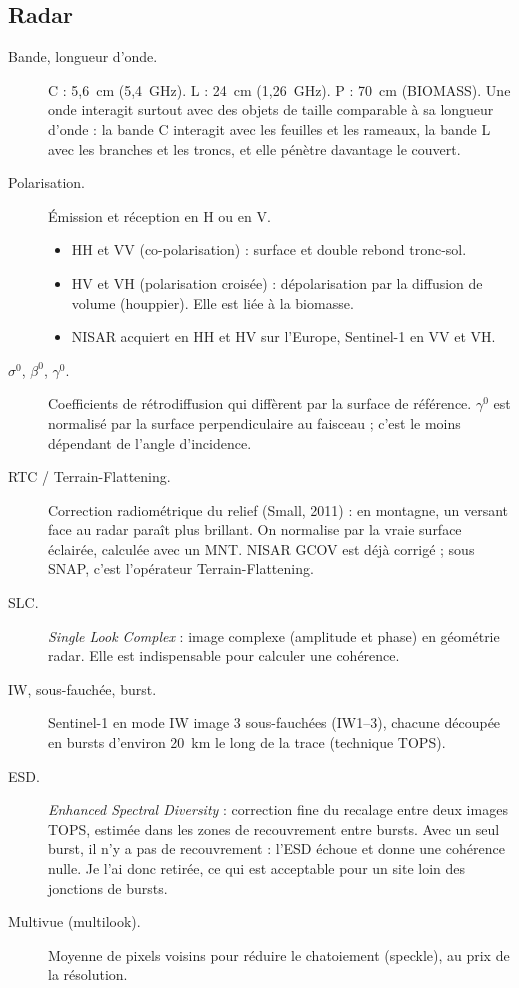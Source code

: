 \documentclass[11pt,a4paper]{article}
\begin{document}
\subsection{Radar}
\begin{description}
\item[Bande, longueur d'onde.] C : 5,6~cm (5,4~GHz). L : 24~cm (1,26~GHz). P : 70~cm (BIOMASS). Une onde interagit
  surtout avec des objets de taille comparable à sa longueur d'onde : la bande C interagit avec les feuilles et les
  rameaux, la bande L avec les branches et les troncs, et elle pénètre davantage le couvert.
\item[Polarisation.] Émission et réception en H ou en V.
  \begin{itemize}
  \item HH et VV (co-polarisation) : surface et double rebond tronc-sol.
  \item HV et VH (polarisation croisée) : dépolarisation par la diffusion de volume (houppier). Elle est liée à la
    biomasse.
  \item NISAR acquiert en HH et HV sur l'Europe, Sentinel-1 en VV et VH.
  \end{itemize}
\item[$\sigma^0$, $\beta^0$, $\gamma^0$.] Coefficients de rétrodiffusion qui diffèrent par la surface de référence.
  $\gamma^0$ est normalisé par la surface perpendiculaire au faisceau ; c'est le moins dépendant de l'angle
  d'incidence.
\item[RTC / Terrain-Flattening.] Correction radiométrique du relief (Small, 2011) : en montagne, un versant face au
  radar paraît plus brillant. On normalise par la vraie surface éclairée, calculée avec un MNT. NISAR GCOV est déjà
  corrigé ; sous SNAP, c'est l'opérateur Terrain-Flattening.
\item[SLC.] \emph{Single Look Complex} : image complexe (amplitude et phase) en géométrie radar. Elle est
  indispensable pour calculer une cohérence.
\item[IW, sous-fauchée, burst.] Sentinel-1 en mode IW image 3 sous-fauchées (IW1--3), chacune découpée en bursts
  d'environ 20~km le long de la trace (technique TOPS).
\item[ESD.] \emph{Enhanced Spectral Diversity} : correction fine du recalage entre deux images TOPS, estimée dans les
  zones de recouvrement entre bursts. Avec un seul burst, il n'y a pas de recouvrement : l'ESD échoue et donne une
  cohérence nulle. Je l'ai donc retirée, ce qui est acceptable pour un site loin des jonctions de bursts.
\item[Multivue (multilook).] Moyenne de pixels voisins pour réduire le chatoiement (speckle), au prix de la
  résolution.
\end{description}
\end{document}
